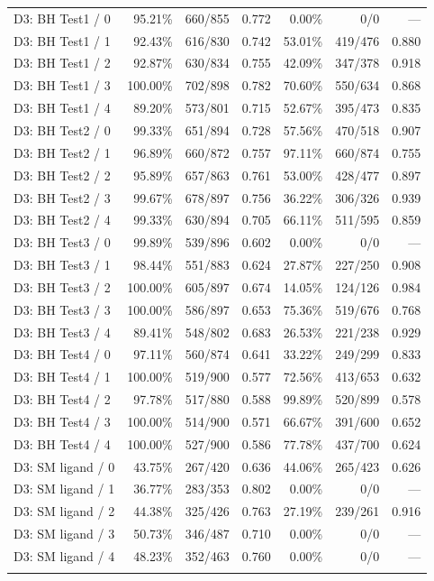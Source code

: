 \begin{longtable}{@{}lrrrrrr@{}}
\addlinespace
D3: BH Test1 / 0 & 95.21\% & 660/855 & 0.772 & 0.00\% & 0/0 & --- \\
D3: BH Test1 / 1 & 92.43\% & 616/830 & 0.742 & 53.01\% & 419/476 & 0.880 \\
D3: BH Test1 / 2 & 92.87\% & 630/834 & 0.755 & 42.09\% & 347/378 & 0.918 \\
D3: BH Test1 / 3 & 100.00\% & 702/898 & 0.782 & 70.60\% & 550/634 & 0.868 \\
D3: BH Test1 / 4 & 89.20\% & 573/801 & 0.715 & 52.67\% & 395/473 & 0.835 \\
\addlinespace
D3: BH Test2 / 0 & 99.33\% & 651/894 & 0.728 & 57.56\% & 470/518 & 0.907 \\
D3: BH Test2 / 1 & 96.89\% & 660/872 & 0.757 & 97.11\% & 660/874 & 0.755 \\
D3: BH Test2 / 2 & 95.89\% & 657/863 & 0.761 & 53.00\% & 428/477 & 0.897 \\
D3: BH Test2 / 3 & 99.67\% & 678/897 & 0.756 & 36.22\% & 306/326 & 0.939 \\
D3: BH Test2 / 4 & 99.33\% & 630/894 & 0.705 & 66.11\% & 511/595 & 0.859 \\
\addlinespace
D3: BH Test3 / 0 & 99.89\% & 539/896 & 0.602 & 0.00\% & 0/0 & --- \\
D3: BH Test3 / 1 & 98.44\% & 551/883 & 0.624 & 27.87\% & 227/250 & 0.908 \\
D3: BH Test3 / 2 & 100.00\% & 605/897 & 0.674 & 14.05\% & 124/126 & 0.984 \\
D3: BH Test3 / 3 & 100.00\% & 586/897 & 0.653 & 75.36\% & 519/676 & 0.768 \\
D3: BH Test3 / 4 & 89.41\% & 548/802 & 0.683 & 26.53\% & 221/238 & 0.929 \\
\addlinespace
D3: BH Test4 / 0 & 97.11\% & 560/874 & 0.641 & 33.22\% & 249/299 & 0.833 \\
D3: BH Test4 / 1 & 100.00\% & 519/900 & 0.577 & 72.56\% & 413/653 & 0.632 \\
D3: BH Test4 / 2 & 97.78\% & 517/880 & 0.588 & 99.89\% & 520/899 & 0.578 \\
D3: BH Test4 / 3 & 100.00\% & 514/900 & 0.571 & 66.67\% & 391/600 & 0.652 \\
D3: BH Test4 / 4 & 100.00\% & 527/900 & 0.586 & 77.78\% & 437/700 & 0.624 \\
\addlinespace
D3: SM ligand / 0 & 43.75\% & 267/420 & 0.636 & 44.06\% & 265/423 & 0.626 \\
D3: SM ligand / 1 & 36.77\% & 283/353 & 0.802 & 0.00\% & 0/0 & --- \\
D3: SM ligand / 2 & 44.38\% & 325/426 & 0.763 & 27.19\% & 239/261 & 0.916 \\
D3: SM ligand / 3 & 50.73\% & 346/487 & 0.710 & 0.00\% & 0/0 & --- \\
D3: SM ligand / 4 & 48.23\% & 352/463 & 0.760 & 0.00\% & 0/0 & --- \\
\addlinespace
\end{longtable}